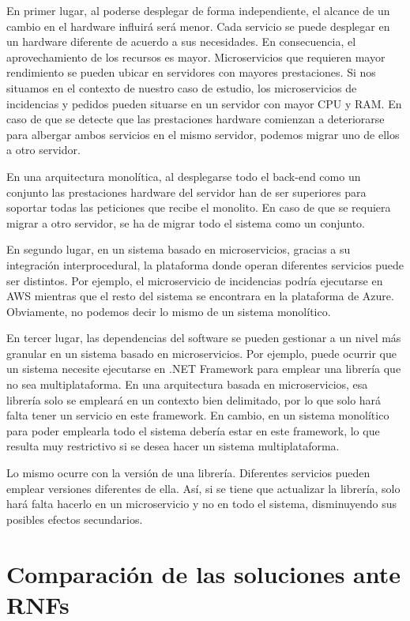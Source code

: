 \documentclass[11pt,spanish,listoffigures]{tfgetsinf}
\begin{document}
En primer lugar, al poderse desplegar de forma independiente, el alcance de un cambio en el hardware influirá será menor. Cada servicio se puede desplegar en un hardware diferente de acuerdo a sus necesidades. En consecuencia, el aprovechamiento de los recursos es mayor. Microservicios que requieren mayor rendimiento se pueden ubicar en servidores con mayores prestaciones. Si nos situamos en el contexto de nuestro caso de estudio, los microservicios de incidencias y pedidos pueden situarse en un servidor con mayor CPU y RAM. En caso de que se detecte que las prestaciones hardware comienzan a deteriorarse para albergar ambos servicios en el mismo servidor, podemos migrar uno de ellos a otro servidor. 

En una arquitectura monolítica, al desplegarse todo el back-end como un conjunto las prestaciones hardware del servidor han de ser superiores para soportar todas las peticiones que recibe el monolito. En caso de que se requiera migrar a otro servidor, se ha de migrar todo el sistema como un conjunto.

En segundo lugar, en un sistema basado en microservicios, gracias a su integración interprocedural, la plataforma donde operan diferentes servicios puede ser distintos. Por ejemplo, el microservicio de incidencias podría ejecutarse en AWS mientras que el resto del sistema se encontrara en la plataforma de Azure. Obviamente, no podemos decir lo mismo de un sistema monolítico.

En tercer lugar, las dependencias del software se pueden gestionar a un nivel más granular en un sistema basado en microservicios. Por ejemplo, puede ocurrir que un sistema necesite ejecutarse en .NET Framework para emplear una librería que no sea multiplataforma. En una arquitectura basada en microservicios, esa librería solo se empleará en un contexto bien delimitado, por lo que solo hará falta tener un servicio en este framework. En cambio, en un sistema monolítico para poder emplearla todo el sistema debería estar en este framework, lo que resulta muy restrictivo si se desea hacer un sistema multiplataforma.

Lo mismo ocurre con la versión de una librería. Diferentes servicios pueden emplear versiones diferentes de ella. Así, si se tiene que actualizar la librería, solo hará falta hacerlo en un microservicio y no en todo el sistema, disminuyendo sus posibles efectos secundarios.

\section{Comparación de las soluciones ante RNFs}
\end{document}
